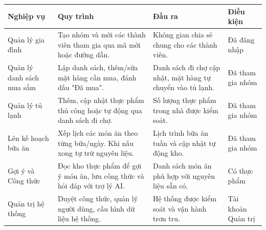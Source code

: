 \documentclass[../main.tex]{subfiles}
\begin{document}
\begin{longtable}{|p{}|p{}|p{}|p{}|}
\hline
\textbf{Nghiệp vụ} & \textbf{Quy trình} & \textbf{Đầu ra} & \textbf{Điều kiện} \\
\hline
\endhead
Quản lý gia đình & Tạo nhóm và mời các thành viên tham gia qua mã mời hoặc đường dẫn. & Không gian chia sẻ chung cho các thành viên. & Đã đăng nhập \\
\hline
Quản lý danh sách mua sắm & Lập danh sách, thêm/sửa mặt hàng cần mua, đánh dấu "Đã mua". & Danh sách đi chợ cập nhật, mặt hàng tự chuyển vào tủ lạnh. & Đã tham gia nhóm \\
\hline
Quản lý tủ lạnh & Thêm, cập nhật thực phẩm thủ công hoặc tự động qua danh sách đi chợ. & Số lượng thực phẩm trong nhà được kiểm soát. & Đã tham gia nhóm \\
\hline
Lên kế hoạch bữa ăn & Xếp lịch các món ăn theo từng bữa/ngày. Khi nấu xong tự trừ nguyên liệu. & Lịch trình bữa ăn tuần và cập nhật tự động kho. & Đã tham gia nhóm \\
\hline
Gợi ý và Công thức & Đọc kho thực phẩm để gợi ý món ăn, lưu công thức và hỏi đáp với trợ lý AI. & Danh sách món ăn phù hợp với nguyên liệu sẵn có. & Có thực phẩm \\
\hline
Quản trị hệ thống & Duyệt công thức, quản lý người dùng, cấu hình dữ liệu hệ thống. & Hệ thống được kiểm soát và vận hành trơn tru. & Tài khoản Quản trị \\
\hline
\end{longtable}
\end{document}
